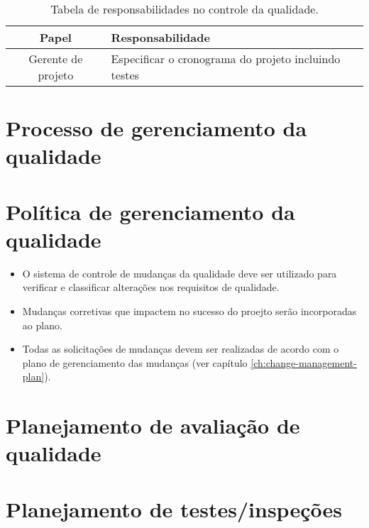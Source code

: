 \begin{table}[H]
	\begin{tabularx}{\textwidth}{| c | X |}
		\hline
		\textbf{Papel}     & \textbf{Responsabilidade}                            \\
		\hline
		Gerente de projeto & Especificar o cronograma do projeto incluindo testes \\
		\hline
	\end{tabularx}
	\centering
    \caption{Tabela de responsabilidades no controle da qualidade.}
\end{table}

\section{Processo de gerenciamento da qualidade}


\section{Política de gerenciamento da qualidade}

\begin{itemize}
	\item O sistema de controle de mudanças da qualidade deve ser utilizado para verificar e classificar alterações nos requisitos de qualidade.
	\item Mudanças corretivas que impactem no sucesso do proejto serão incorporadas ao plano.
	\item Todas as solicitações de mudanças devem ser realizadas de acordo com o plano de gerenciamento das mudanças (ver capítulo \ref{ch:change-management-plan}).
\end{itemize}

\section{Planejamento de avaliação de qualidade}


\section{Planejamento de testes/inspeções}


